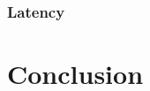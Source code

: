 \documentclass{acmsig}
\begin{document}
\subsubsection{Latency}







\section{Conclusion}



% 
% 
\end{document}
